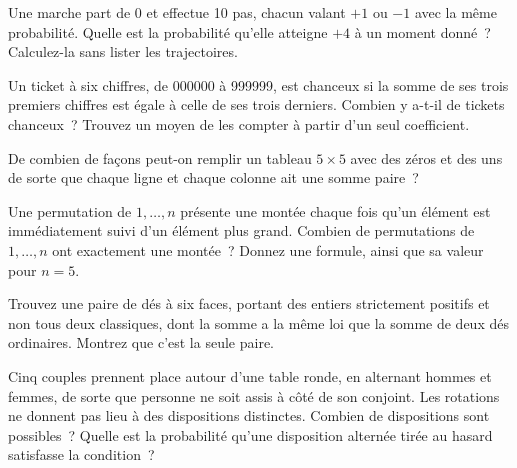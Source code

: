 \begin{question}\label{iq:iv1:counting-and-symmetry:34}
Une marche part de 0 et effectue 10 pas, chacun valant $+1$ ou $-1$ avec la même probabilité. Quelle est la probabilité qu'elle atteigne $+4$ à un moment donné~? Calculez-la sans lister les trajectoires.
\end{question}

\begin{question}\label{iq:iv1:counting-and-symmetry:35}
Un ticket à six chiffres, de 000000 à 999999, est chanceux si la somme de ses trois premiers chiffres est égale à celle de ses trois derniers. Combien y a-t-il de tickets chanceux~? Trouvez un moyen de les compter à partir d'un seul coefficient.
\end{question}

\begin{question}\label{iq:iv1:counting-and-symmetry:36}
De combien de façons peut-on remplir un tableau $5 \times 5$ avec des zéros et des uns de sorte que chaque ligne et chaque colonne ait une somme paire~?
\end{question}

\begin{question}\label{iq:iv1:counting-and-symmetry:37}
Une permutation de $1, \dots, n$ présente une montée chaque fois qu'un élément est immédiatement suivi d'un élément plus grand. Combien de permutations de $1, \dots, n$ ont exactement une montée~? Donnez une formule, ainsi que sa valeur pour $n = 5$.
\end{question}

\begin{question}\label{iq:iv1:counting-and-symmetry:38}
Trouvez une paire de dés à six faces, portant des entiers strictement positifs et non tous deux classiques, dont la somme a la même loi que la somme de deux dés ordinaires. Montrez que c'est la seule paire.
\end{question}

\begin{question}\label{iq:iv1:counting-and-symmetry:39}
Cinq couples prennent place autour d'une table ronde, en alternant hommes et femmes, de sorte que personne ne soit assis à côté de son conjoint. Les rotations ne donnent pas lieu à des dispositions distinctes. Combien de dispositions sont possibles~? Quelle est la probabilité qu'une disposition alternée tirée au hasard satisfasse la condition~?
\end{question}

